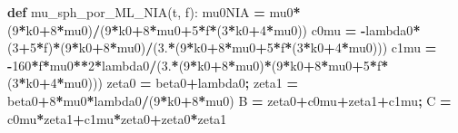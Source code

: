 \documentclass[
  a4paper,
  numbers=noendperiod,
  DIV=12]{scrreprt}
\newenvironment{Shaded}{\begin{snugshade}}{\end{snugshade}}
\newcommand{\DecValTok}[1]{\textcolor[rgb]{0.00,0.00,0.81}{#1}}
\newcommand{\FloatTok}[1]{\textcolor[rgb]{0.00,0.00,0.81}{#1}}
\newcommand{\KeywordTok}[1]{\textcolor[rgb]{0.13,0.29,0.53}{\textbf{#1}}}
\newcommand{\NormalTok}[1]{#1}
\newcommand{\OperatorTok}[1]{\textcolor[rgb]{0.81,0.36,0.00}{\textbf{#1}}}
\begin{document}
\begin{Shaded}
\begin{Highlighting}[]
\KeywordTok{def}\NormalTok{ mu\_sph\_por\_ML\_NIA(t, f):}
\NormalTok{    mu0NIA }\OperatorTok{=}\NormalTok{ mu0}\OperatorTok{*}\NormalTok{(}\DecValTok{9}\OperatorTok{*}\NormalTok{k0}\OperatorTok{+}\DecValTok{8}\OperatorTok{*}\NormalTok{mu0)}\OperatorTok{/}\NormalTok{(}\DecValTok{9}\OperatorTok{*}\NormalTok{k0}\OperatorTok{+}\DecValTok{8}\OperatorTok{*}\NormalTok{mu0}\OperatorTok{+}\DecValTok{5}\OperatorTok{*}\NormalTok{f}\OperatorTok{*}\NormalTok{(}\DecValTok{3}\OperatorTok{*}\NormalTok{k0}\OperatorTok{+}\DecValTok{4}\OperatorTok{*}\NormalTok{mu0))}
\NormalTok{    c0mu   }\OperatorTok{=} \OperatorTok{{-}}\NormalTok{lambda0}\OperatorTok{*}\NormalTok{(}\DecValTok{3}\OperatorTok{+}\DecValTok{5}\OperatorTok{*}\NormalTok{f)}\OperatorTok{*}\NormalTok{(}\DecValTok{9}\OperatorTok{*}\NormalTok{k0}\OperatorTok{+}\DecValTok{8}\OperatorTok{*}\NormalTok{mu0)}\OperatorTok{/}\NormalTok{(}\FloatTok{3.}\OperatorTok{*}\NormalTok{(}\DecValTok{9}\OperatorTok{*}\NormalTok{k0}\OperatorTok{+}\DecValTok{8}\OperatorTok{*}\NormalTok{mu0}\OperatorTok{+}\DecValTok{5}\OperatorTok{*}\NormalTok{f}\OperatorTok{*}\NormalTok{(}\DecValTok{3}\OperatorTok{*}\NormalTok{k0}\OperatorTok{+}\DecValTok{4}\OperatorTok{*}\NormalTok{mu0)))}
\NormalTok{    c1mu   }\OperatorTok{=} \OperatorTok{{-}}\DecValTok{160}\OperatorTok{*}\NormalTok{f}\OperatorTok{*}\NormalTok{mu0}\OperatorTok{**}\DecValTok{2}\OperatorTok{*}\NormalTok{lambda0}\OperatorTok{/}\NormalTok{(}\FloatTok{3.}\OperatorTok{*}\NormalTok{(}\DecValTok{9}\OperatorTok{*}\NormalTok{k0}\OperatorTok{+}\DecValTok{8}\OperatorTok{*}\NormalTok{mu0)}\OperatorTok{*}\NormalTok{(}\DecValTok{9}\OperatorTok{*}\NormalTok{k0}\OperatorTok{+}\DecValTok{8}\OperatorTok{*}\NormalTok{mu0}\OperatorTok{+}\DecValTok{5}\OperatorTok{*}\NormalTok{f}\OperatorTok{*}\NormalTok{(}\DecValTok{3}\OperatorTok{*}\NormalTok{k0}\OperatorTok{+}\DecValTok{4}\OperatorTok{*}\NormalTok{mu0)))}
\NormalTok{    zeta0 }\OperatorTok{=}\NormalTok{ beta0}\OperatorTok{+}\NormalTok{lambda0}\OperatorTok{;}\NormalTok{  zeta1 }\OperatorTok{=}\NormalTok{ beta0}\OperatorTok{+}\DecValTok{8}\OperatorTok{*}\NormalTok{mu0}\OperatorTok{*}\NormalTok{lambda0}\OperatorTok{/}\NormalTok{(}\DecValTok{9}\OperatorTok{*}\NormalTok{k0}\OperatorTok{+}\DecValTok{8}\OperatorTok{*}\NormalTok{mu0)}
\NormalTok{    B }\OperatorTok{=}\NormalTok{ zeta0}\OperatorTok{+}\NormalTok{c0mu}\OperatorTok{+}\NormalTok{zeta1}\OperatorTok{+}\NormalTok{c1mu}\OperatorTok{;}\NormalTok{  C }\OperatorTok{=}\NormalTok{ c0mu}\OperatorTok{*}\NormalTok{zeta1}\OperatorTok{+}\NormalTok{c1mu}\OperatorTok{*}\NormalTok{zeta0}\OperatorTok{+}\NormalTok{zeta0}\OperatorTok{*}\NormalTok{zeta1}

\end{Highlighting}
\end{Shaded}
\end{document}
